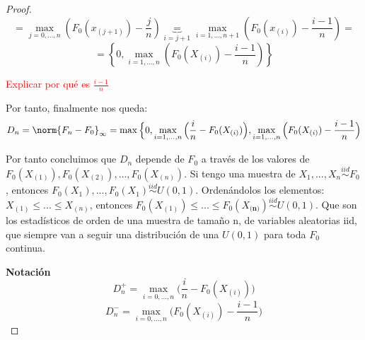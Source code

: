 \documentclass[palatino,nochap]{apuntes}
\begin{document}
\begin{proof}
\[= \max_{j=0,…,n} \left( F_0(x_{(j+1)}) - \frac{j}{n} \right) \underbrace{=}_{i=j+1} \max_{i=1,…,n+1} \left( F_0(x_{(i)}) - \frac{i-1}{n} \right) =  \]
$$ = \left\{ 0, \max_{i=1,...,n} \left( F_0(X_{(i)}) - \frac{i-1}{n} \right) \right\} $$

\textcolor{red}{Explicar por qué es $\frac{i-1}{n}$}

Por tanto, finalmente nos queda:
$$ D_n =  \norm{F_n-F_0}_{\infty} = \max\Big\{ 0, \max_{i=1,...,n} \Big( \frac{i}{n} - F_0(X_{(i)}) \Big) , \max_{i=1,...,n} \Big( F_0(X_{(i)}) - \frac{i-1}{n} \Big)$$

Por tanto concluimos que $D_n$ depende de $F_0$ a través de los valores de $F_0(X_{(1)}), F_0(X_{(2)}),...,F_0(X_{(n)})$. Si tengo una muestra de $X_1,...,X_n \stackrel{iid}{\sim}F_0$, entonces $F_0(X_1),...,F_0(X_1) \stackrel{iid}{\sim} U(0,1)$. Ordenándolos los elementos: $X_{(1)}\leq...\leq X_{(n)}$, entonces $F_0(X_{(1)})\leq...\leq F_0(X_\textbf{{(n)}}) \stackrel{iid}{\sim} U(0,1)$. Que son los estadísticos de orden de una muestra de tamaño n, de variables aleatorias iid, que siempre van a seguir una distribución de una $U(0,1)$ para toda $F_0$ continua.

\textbf{Notación}
$$D_n^+=\max_{i=0,...,n} \Big( \frac{i}{n} - F_0(X_{(i)}) \Big)$$
$$D_n^-= \max_{i=0,...,n} \Big( F_0(X_{(i)}) - \frac{i-1}{n} \Big)$$

\end{proof}
\end{document}
